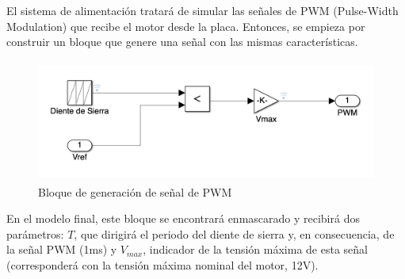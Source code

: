 \documentclass[a4paper, 12pt]{article}
\begin{document}
El sistema de alimentación tratará de simular las señales de PWM (Pulse-Width Modulation) que recibe el motor desde la placa. Entonces, se empieza por construir un bloque que genere una señal con las mismas características.
\begin{figure}[h!]
	\centering
	\includegraphics[height=4cm]{bloquepwm}
	\caption{Bloque de generación de señal de PWM}
\end{figure}
En el modelo final, este bloque se encontrará enmascarado y recibirá dos parámetros: $T$, que dirigirá el periodo del diente de sierra y, en consecuencia, de la señal PWM (1ms) y $V_{max}$, indicador de la tensión máxima de esta señal (corresponderá con la tensión máxima nominal del motor, 12V).\\ 
\end{document}
